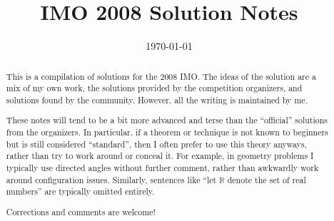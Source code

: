 \documentclass[11pt]{scrartcl}
\title{IMO 2008 Solution Notes}
\date{\today}
\begin{document}
\maketitle

\begin{abstract}
This is a compilation of solutions
for the 2008 IMO.
The ideas of the solution are a mix of my own work,
the solutions provided by the competition organizers,
and solutions found by the community.
However, all the writing is maintained by me.

These notes will tend to be a bit more advanced and terse than the ``official''
solutions from the organizers.
In particular, if a theorem or technique is not known to beginners
but is still considered ``standard'', then I often prefer to
use this theory anyways, rather than try to work around or conceal it.
For example, in geometry problems I typically use directed angles
without further comment, rather than awkwardly work around configuration issues.
Similarly, sentences like ``let $\mathbb{R}$ denote the set of real numbers''
are typically omitted entirely.

Corrections and comments are welcome!
\end{abstract}

\tableofcontents
\newpage

\addtocounter{section}{-1}
\end{document}
